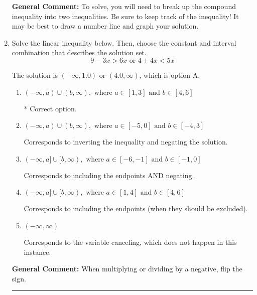 \documentclass{extbook}[14pt]
\newcommand{\litem}[1]{\item #1

\rule{\textwidth}{0.4pt}}
\begin{document}
\begin{enumerate}
{\begin{enumerate}[label=\Alph*.]
\end{enumerate}

\textbf{General Comment:} To solve, you will need to break up the compound inequality into two inequalities. Be sure to keep track of the inequality! It may be best to draw a number line and graph your solution.
}
\litem{
Solve the linear inequality below. Then, choose the constant and interval combination that describes the solution set.
\[ 9 - 3 x > 6 x \text{ or } 4 + 4 x < 5 x \]

The solution is \( (-\infty, 1.0) \text{ or } (4.0, \infty) \), which is option A.\begin{enumerate}[label=\Alph*.]
\item \( (-\infty, a) \cup (b, \infty), \text{ where } a \in [1, 3] \text{ and } b \in [4, 6] \)

 * Correct option.
\item \( (-\infty, a) \cup (b, \infty), \text{ where } a \in [-5, 0] \text{ and } b \in [-4, 3] \)

Corresponds to inverting the inequality and negating the solution.
\item \( (-\infty, a] \cup [b, \infty), \text{ where } a \in [-6, -1] \text{ and } b \in [-1, 0] \)

Corresponds to including the endpoints AND negating.
\item \( (-\infty, a] \cup [b, \infty), \text{ where } a \in [1, 4] \text{ and } b \in [4, 6] \)

Corresponds to including the endpoints (when they should be excluded).
\item \( (-\infty, \infty) \)

Corresponds to the variable canceling, which does not happen in this instance.
\end{enumerate}

\textbf{General Comment:} When multiplying or dividing by a negative, flip the sign.
}
\end{enumerate}
\end{document}
